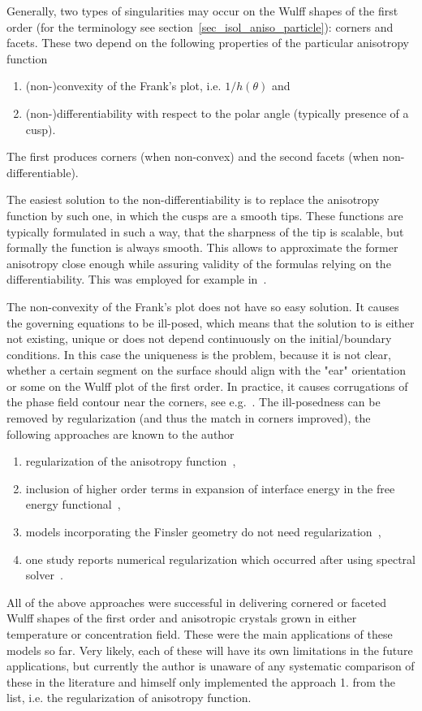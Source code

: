 	Generally, two types of singularities may occur on the Wulff shapes of the first order (for the terminology see section~\ref{sec_isol_aniso_particle}): corners and facets. These two depend on the following properties of the particular anisotropy function
	\begin{enumerate}
		\item (non-)convexity of the Frank's plot, i.e. $1/h(\theta)$ and
		\item (non-)differentiability with respect to the polar angle (typically presence of a cusp).
	\end{enumerate}
	The first produces corners (when non-convex) and the second facets (when non-differentiable). 
	
	The easiest solution to the non-differentiability is to replace the anisotropy function by such one, in which the cusps are a smooth tips. These functions are typically formulated in such a way, that the sharpness of the tip is scalable, but formally the function is always smooth. This allows to approximate the former anisotropy close enough while assuring validity of the formulas relying on the differentiability. This was employed for example in~\cite{Debierre2003,Loginova2004,Miura2013}.
	
	The non-convexity of the Frank's plot does not have so easy solution. It causes the governing equations to be ill-posed, which means that the solution to is either not existing, unique or does not depend continuously on the initial/boundary conditions. In this case the uniqueness is the problem, because it is not clear, whether a certain segment on the surface should align with the "ear" orientation or some on the Wulff plot of the first order. In practice, it causes corrugations of the phase field contour near the corners, see e.g.~\cite{Tschukin2017}. The ill-posedness can be removed by regularization (and thus the match in corners improved), the following approaches are known to the author
	\begin{enumerate}
		\item regularization of the anisotropy function~\cite{Taylor1998,Eggleston2001,Kobayashi2001},
		\item inclusion of higher order terms in expansion of interface energy in the free energy functional~\cite{Wheeler2006, Torabi2009, Tschukin2017},
		\item models incorporating the Finsler geometry do not need regularization~\cite{Bellettini1996,Benes2003},
		\item one study reports numerical regularization which occurred after using spectral solver~\cite{Toth2015}.
	\end{enumerate}
	All of the above approaches were successful in delivering cornered or faceted Wulff shapes of the first order and anisotropic crystals grown in either temperature or concentration field. These were the main applications of these models so far. Very likely, each of these will have its own limitations in the future applications, but currently the author is unaware of any systematic comparison of these in the literature and himself only implemented the approach 1. from the list, i.e. the regularization of anisotropy function.

